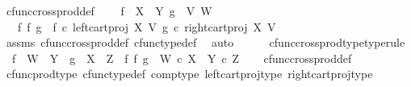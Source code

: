 \begin{isabellebody}
\ cfunc{\isacharunderscore}{\kern0pt}cross{\isacharunderscore}{\kern0pt}prod{\isacharunderscore}{\kern0pt}def{}{\isacharcolon}{\kern0pt}\ \isanewline
\ \ \ {\isachardoublequoteopen}f\ {\isacharcolon}{\kern0pt}\ X\ {\isasymrightarrow}\ Y{\isachardoublequoteclose}\ {\isachardoublequoteopen}g\ {\isacharcolon}{\kern0pt}\ V{\isasymrightarrow}\ W{\isachardoublequoteclose}\isanewline
\ \ \ {\isachardoublequoteopen}f\ {\isasymtimes}\isactrlsub f\ g\ {\isacharequal}{\kern0pt}\ {\isasymlangle}f\ {\isasymcirc}\isactrlsub c\ left{\isacharunderscore}{\kern0pt}cart{\isacharunderscore}{\kern0pt}proj\ X\ V{\isacharcomma}{\kern0pt}\ g\ {\isasymcirc}\isactrlsub c\ right{\isacharunderscore}{\kern0pt}cart{\isacharunderscore}{\kern0pt}proj\ X\ V{\isasymrangle}{\isachardoublequoteclose}\isanewline
%
\isadelimproof
\ \ %
\endisadelimproof
%
\isatagproof
{}\isamarkupfalse%
\ assms\ cfunc{\isacharunderscore}{\kern0pt}cross{\isacharunderscore}{\kern0pt}prod{\isacharunderscore}{\kern0pt}def\ cfunc{\isacharunderscore}{\kern0pt}type{\isacharunderscore}{\kern0pt}def\ \isamarkupfalse%
\ auto%
\endisatagproof
{\isafoldproof}%
%
\isadelimproof
\isanewline
%
\endisadelimproof
\ \ \ \ \isanewline
{}\isamarkupfalse%
\ cfunc{\isacharunderscore}{\kern0pt}cross{\isacharunderscore}{\kern0pt}prod{\isacharunderscore}{\kern0pt}type{\isacharbrackleft}{\kern0pt}type{\isacharunderscore}{\kern0pt}rule{\isacharbrackright}{\kern0pt}{\isacharcolon}{\kern0pt}\isanewline
\ \ {\isachardoublequoteopen}f\ {\isacharcolon}{\kern0pt}\ W\ {\isasymrightarrow}\ Y\ {\isasymLongrightarrow}\ g\ {\isacharcolon}{\kern0pt}\ X\ {\isasymrightarrow}\ Z\ {\isasymLongrightarrow}\ f\ {\isasymtimes}\isactrlsub f\ g\ {\isacharcolon}{\kern0pt}\ W\ {\isasymtimes}\isactrlsub c\ X\ {\isasymrightarrow}\ Y\ {\isasymtimes}\isactrlsub c\ Z{\isachardoublequoteclose}\isanewline
%
\isadelimproof
\ \ %
\endisadelimproof
%
\isatagproof
{}\isamarkupfalse%
\ cfunc{\isacharunderscore}{\kern0pt}cross{\isacharunderscore}{\kern0pt}prod{\isacharunderscore}{\kern0pt}def\isanewline
\ \ \isamarkupfalse%
\ cfunc{\isacharunderscore}{\kern0pt}prod{\isacharunderscore}{\kern0pt}type\ cfunc{\isacharunderscore}{\kern0pt}type{\isacharunderscore}{\kern0pt}def\ comp{\isacharunderscore}{\kern0pt}type\ left{\isacharunderscore}{\kern0pt}cart{\isacharunderscore}{\kern0pt}proj{\isacharunderscore}{\kern0pt}type\ right{\isacharunderscore}{\kern0pt}cart{\isacharunderscore}{\kern0pt}proj{\isacharunderscore}{\kern0pt}type\ \isamarkupfalse%

\end{isabellebody}
